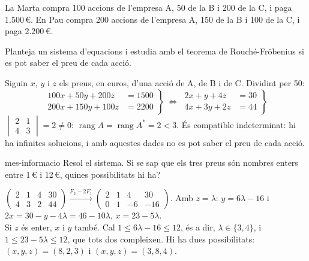 La Marta compra 100 accions de l'empresa A, 50 de la B i 200 de la C, i paga 1.500\,€. En Pau compra
200 accions de l'empresa A, 150 de la B i 100 de la C, i paga 2.200\,€.

\begin{apartats}

Planteja un sistema d'equacions i estudia amb el teorema de Rouché-Fröbenius si es pot saber el preu de
cada acció.

\begin{solucio}
Siguin $x$, $y$ i $z$ els preus, en euros, d'una acció de A, de B i de C. Dividint per 50:
\[
\left.\begin{aligned}100x+50y+200z&=1500\\200x+150y+100z&=2200\end{aligned}\right\}
\ \Longleftrightarrow\
\left.\begin{aligned}2x+y+4z&=30\\4x+3y+2z&=44\end{aligned}\right\}
\]
$\begin{vmatrix}2&1\\4&3\end{vmatrix}=2\ne0$: $\operatorname{rang}A=\operatorname{rang}A^*=2<3$. És
compatible indeterminat: hi ha infinites solucions, i amb aquestes dades no es pot saber el preu de
cada acció.
\end{solucio}

\begin{tria}{mes-informacio}
Resol el sistema. Si se sap que els tres preus són nombres enters entre 1\,€ i 12\,€, quines
possibilitats hi ha?

\begin{solucio}
$\left(\begin{array}{ccc|c}2&1&4&30\\4&3&2&44\end{array}\right)\xrightarrow{F_2-2F_1}
\left(\begin{array}{ccc|c}2&1&4&30\\0&1&-6&-16\end{array}\right)$. Amb $z=\lambda$: $y=6\lambda-16$ i
$2x=30-y-4\lambda=46-10\lambda$, $x=23-5\lambda$.\\
Si $z$ és enter, $x$ i $y$ també. Cal $1\le6\lambda-16\le12$, és a dir, $\lambda\in\{3,4\}$, i
$1\le23-5\lambda\le12$, que tots dos compleixen. Hi ha dues possibilitats: $(x,y,z)=(8,2,3)$ i
$(x,y,z)=(3,8,4)$.
\end{solucio}


\end{tria}
\end{apartats}
